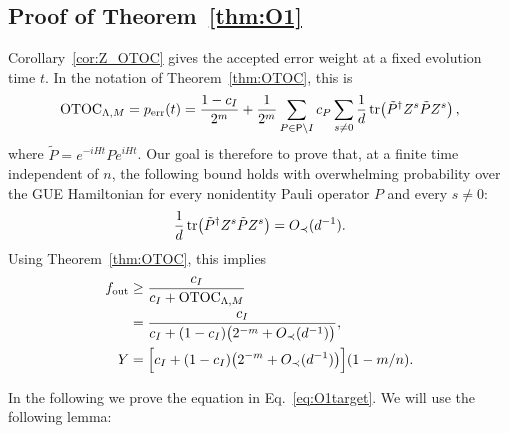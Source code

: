 \documentclass[onecolumn,prx,longbibliography,nofootinbib, superscriptaddress]{revtex4-2}
\theoremstyle{recap}
\begin{document}
\subsection{Proof of Theorem~\ref{thm:O1}}\label{appendix:O1}
Corollary~\ref{cor:Z_OTOC} gives the accepted error weight at a fixed evolution time $t$. In the notation of Theorem~\ref{thm:OTOC}, this is
\begin{equation}
    \mathrm{OTOC}_{\Lambda,M}=p_{\mathrm{err}}(t)
    =\frac{1-c_I}{2^m}
    +\frac{1}{2^m}\sum_{P\in\mathsf{P}\backslash I}c_P
    \sum_{s\neq 0}\frac{1}{d}\tr\!\left(\tilde{P}^{\dagger}Z^s\tilde{P}Z^s\right),
\end{equation}
where $\tilde{P}=e^{-iHt}Pe^{iHt}$.
Our goal is therefore to prove that, at a finite time independent of $n$, the following bound holds with overwhelming probability over the GUE Hamiltonian for every nonidentity Pauli operator $P$ and every $s\neq 0$:
\begin{equation}\label{eq:O1target}
    \frac{1}{d}\tr(\tilde{P}^{\dagger}Z^{s}\tilde{P}Z^{s})=O_{\prec}(d^{-1}).
\end{equation}
Using Theorem~\ref{thm:OTOC}, this implies
\begin{equation}
\begin{split}
    f_{\mathrm{out}}&\geq\frac{c_{I}}{c_{I}+\mathrm{OTOC}_{\Lambda,M}}\\
    &=\frac{c_{I}}{c_{I}+(1-c_I)\bigl(2^{-m}+O_{\prec}(d^{-1})\bigr)},\\
    Y&=\Bigl[c_I+(1-c_I)\bigl(2^{-m}+O_{\prec}(d^{-1})\bigr)\Bigr](1-m/n).
\end{split}
\end{equation}

In the following we prove the equation in Eq.~\eqref{eq:O1target}. We will use the following lemma:
\end{document}
